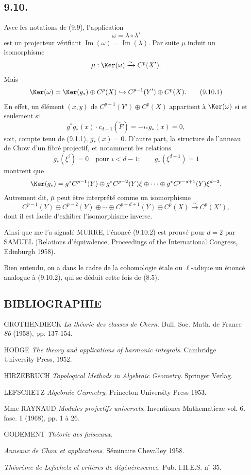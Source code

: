 \subsection*{9.10.}

Avec les notations de (9.9), l'application
\[
\omega=\lambda\circ\lambda'
\]
est un projecteur vérifiant $\operatorname{Im}(\omega)=\operatorname{Im}(\lambda)$. Par suite $\mu$ induit un isomorphisme
\[
\bar\mu:\Ker(\omega)\xrightarrow{\sim}C^p(X').
\]
Mais
\[
\Ker(\omega)=\Ker(g_*)\oplus C^p(X)\hookrightarrow C^{p-1}(Y')\oplus C^p(X).
\tag{9.10.1}
\]
En effet, un élément $(x,y)$ de $C^{p-1}(Y')\oplus C^p(X)$ appartient à $\Ker(\omega)$ si et seulement si
\[
g^*g_*(x)\cdot c_{d-1}(\check F)=-i_*g_*(x)=0,
\]
soit, compte tenu de (9.1.1), $g_*(x)=0$. D'autre part, la structure de l'anneau de Chow d'un fibré projectif, et notamment les relations
\[
g_*(\xi^i)=0\quad\text{pour }i<d-1;\qquad g_*(\xi^{d-1})=1
\]
montrent que
\[
\Ker(g_*)=g^*C^{p-1}(Y)\oplus g^*C^{p-2}(Y)\xi\oplus\cdots\oplus g^*C^{p-d+1}(Y)\xi^{d-2}.
\]
Autrement dit, $\bar\mu$ peut être interprété comme un isomorphisme
\[
C^{p-1}(Y)\oplus C^{p-2}(Y)\oplus\cdots\oplus C^{p-d+1}(Y)\oplus C^p(X)
\xrightarrow{\sim}C^p(X'),
\tag{9.10.2}
\]
dont il est facile d'exhiber l'isomorphisme inverse.

Ainsi que me l'a signalé MURRE, l'énoncé (9.10.2) est prouvé pour $d=2$ par SAMUEL (Relations d'équivalence, Proceedings of the International Congress, Edinburgh 1958).

Bien entendu, on a dans le cadre de la cohomologie étale ou $\ell$-adique un énoncé analogue à (9.10.2), qui se déduit cette fois de (8.5).

\subsection*{BIBLIOGRAPHIE}

\begin{enumerate}[label={[\arabic*]}]
\item GROTHENDIECK \emph{La théorie des classes de Chern}. Bull. Soc. Math. de France \emph{86} (1958), pp. 137-154.
\item HODGE \emph{The theory and applications of harmonic integrals}. Cambridge University Press, 1952.
\item HIRZEBRUCH \emph{Topological Methods in Algebraic Geometry}. Springer Verlag.
\item LEFSCHETZ \emph{Algebraic Geometry}. Princeton University Press 1953.
\item Mme RAYNAUD \emph{Modules projectifs universels}. Inventiones Mathematicae vol. 6. fasc. 1 (1968), pp. 1 à 26.
\item[{[TF]}] GODEMENT \emph{Théorie des faisceaux}.
\item[{[CH]}] \emph{Anneaux de Chow et applications}. Séminaire Chevalley 1958.
\item[{[6]}] \emph{Théorème de Lefschetz et critères de dégénérescence}. Pub. I.H.E.S. n$^\circ$ 35.
\end{enumerate}


